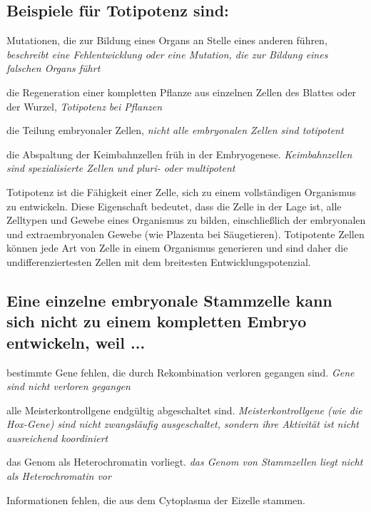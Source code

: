 \documentclass{article}
\newcommand{\cmark}{\ding{51}}%
\newcommand{\done}{\rlap{$\square$}{\raisebox{2pt}{\large\hspace{1pt}\cmark}}%
\hspace{-2.5pt}}
\newcommand{\maybe}{\rlap{($\square$)}{(\raisebox{2pt}{\large\hspace{1pt}\cmark}}%
\hspace{-2.5pt}}
\begin{document}
\subsection*{Beispiele für Totipotenz sind:}
\begin{todolist}%
\item Mutationen, die zur Bildung eines Organs an Stelle eines anderen führen, \textit{\scriptsize beschreibt eine Fehlentwicklung oder eine Mutation, die zur Bildung eines falschen Organs führt}
\item[\done] die Regeneration einer kompletten Pflanze aus einzelnen Zellen des
Blattes oder der Wurzel, \textit{\scriptsize Totipotenz bei Pflanzen}
\item[\maybe] die Teilung embryonaler Zellen, \textit{\scriptsize nicht alle embryonalen Zellen sind totipotent}
\item die Abspaltung der Keimbahnzellen früh in der Embryogenese. \textit{\scriptsize Keimbahnzellen sind spezialisierte Zellen und pluri- oder multipotent}
\end{todolist}
\begin{mybox}[title={Totipotenz}]
Totipotenz ist die Fähigkeit einer Zelle, sich zu einem vollständigen Organismus zu entwickeln. Diese Eigenschaft bedeutet, dass die Zelle in der Lage ist, alle Zelltypen und Gewebe eines Organismus zu bilden, einschließlich der embryonalen und extraembryonalen Gewebe (wie Plazenta bei Säugetieren). Totipotente Zellen können jede Art von Zelle in einem Organismus generieren und sind daher die undifferenziertesten Zellen mit dem breitesten Entwicklungspotenzial.
\end{mybox}

\subsection*{Eine einzelne embryonale Stammzelle kann sich nicht zu einem
kompletten Embryo entwickeln, weil ...}
\begin{todolist}%
\item bestimmte Gene fehlen, die durch Rekombination verloren gegangen
sind. \textit{\scriptsize Gene sind nicht verloren gegangen}
\item alle Meisterkontrollgene endgültig abgeschaltet sind. \textit{\scriptsize Meisterkontrollgene (wie die Hox-Gene) sind nicht zwangsläufig ausgeschaltet, sondern ihre Aktivität ist nicht ausreichend koordiniert} 
\item das Genom als Heterochromatin vorliegt. \textit{\scriptsize das Genom von Stammzellen liegt nicht als Heterochromatin vor}
\item[\done] Informationen fehlen, die aus dem Cytoplasma der Eizelle stammen. \textit{\scriptsize }  
\end{todolist}
\end{document}
